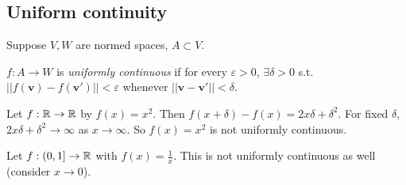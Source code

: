 \documentclass[a4paper]{article}
\begin{document}
\subsection{Uniform continuity}
Suppose $V,W$ are normed spaces, $A \subset V$.

\begin{defi}
$f:A \to W$ is \emph{uniformly continuous} if for every $\varepsilon>0$, $\exists \delta > 0$ s.t. $||f\left(\mathbf{v}\right) - f\left(\mathbf{v}'\right) || < \varepsilon$ whenever $||\mathbf{v}-\mathbf{v}'||<\delta$.
\end{defi}

\begin{eg}
Let $f:\mathbb{R} \to \mathbb{R}$ by $f\left(x\right) = x^2$. Then $f\left(x+\delta\right) - f\left(x\right) = 2x\delta + \delta^2$. For fixed $\delta$, $2x\delta+\delta^2 \to \infty$ as $x \to \infty$. So $f\left(x\right) =x^2$ is not uniformly continuous.
\end{eg}

\begin{eg}
Let $f:\left(0,1\right] \to \mathbb{R}$ with $f\left(x\right) = \frac{1}{x}$. This is not uniformly continuous as well (consider $x \to 0$).
\end{eg}
\end{document}
